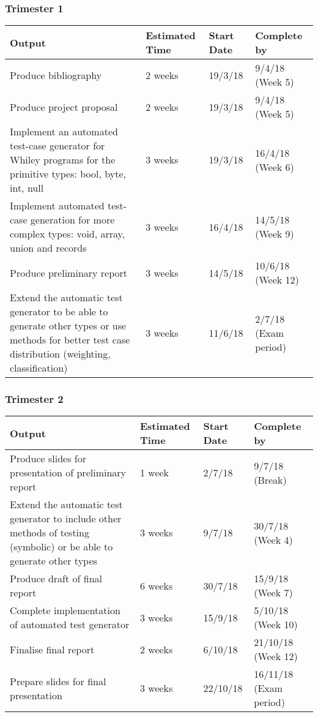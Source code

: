 \documentclass[11pt, a4paper, twoside, openright]{report}
\begin{document}
\subsubsection*{Trimester 1}
\begin{tabular}{ |p{10cm}|p{2cm}|p{2cm}|p{2cm}| }
	\hline
	\textbf{Output} & \textbf{Estimated Time} &
	\textbf{Start Date} & \textbf{Complete by}\\
	\hline
	Produce bibliography & 2 weeks & 19/3/18
	& 9/4/18 (Week 5) \\
	\hline
	Produce project proposal & 2 weeks & 19/3/18 & 9/4/18 (Week 5) \\
	\hline
	Implement an automated test-case generator for Whiley programs for the primitive types: bool, byte, int, null & 3 weeks & 19/3/18 & 16/4/18 (Week 6) \\
	
	\hline
	Implement automated test-case generation for more complex types: void, array, union and records & 3 weeks & 16/4/18 & 14/5/18 (Week 9) \\
	\hline
	Produce preliminary report & 3 weeks & 14/5/18 & 10/6/18 (Week 12) \\	
	\hline
	Extend the automatic test generator to be able to generate other types or use methods for better test case distribution (weighting, classification) & 3 weeks & 11/6/18 & 2/7/18 (Exam period) \\
	\hline
\end{tabular}

\subsubsection*{Trimester 2}
\begin{tabular}{ |p{10cm}|p{3cm}|p{2cm}|p{2cm}| }
	\hline
	\textbf{Output} & \textbf{Estimated Time} & \textbf{Start Date} & \textbf{Complete by}\\
	\hline
	Produce slides for presentation of preliminary report & 1 week & 2/7/18 & 9/7/18 (Break)\\
	\hline
	Extend the automatic test generator to include other methods of testing (symbolic) or be able to generate other types & 3 weeks & 9/7/18 & 30/7/18 (Week 4)\\
	\hline
	Produce draft of final report & 6 weeks & 30/7/18 & 15/9/18 (Week 7)\\
	\hline
	Complete implementation of automated test generator & 3 weeks & 15/9/18 & 5/10/18 (Week 10) \\
	\hline
	Finalise final report & 2 weeks & 6/10/18 & 21/10/18 (Week 12) \\
	\hline
	Prepare slides for final presentation & 3 weeks & 22/10/18 & 16/11/18 (Exam period)\\
	\hline
\end{tabular}
\end{document}
